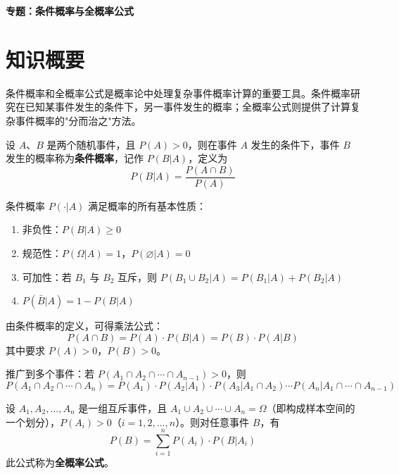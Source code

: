 \documentclass[11pt]{ctexrep}
\begin{document}
\begin{center}
    {\LARGE\bfseries 专题：条件概率与全概率公式}
\end{center}

\section*{知识概要}

条件概率和全概率公式是概率论中处理复杂事件概率计算的重要工具。条件概率研究在已知某事件发生的条件下，另一事件发生的概率；全概率公式则提供了计算复杂事件概率的"分而治之"方法。

\begin{definition}[条件概率]
    设 $A$、$B$ 是两个随机事件，且 $P(A) > 0$，则在事件 $A$ 发生的条件下，事件 $B$ 发生的概率称为\textbf{条件概率}，记作 $P(B|A)$，定义为
    \[
        P(B|A) = \frac{P(A \cap B)}{P(A)}
    \]
\end{definition}

\begin{property}[条件概率的性质]
    条件概率 $P(\cdot | A)$ 满足概率的所有基本性质：
    \begin{enumerate}
        \item 非负性：$P(B|A) \geq 0$
        \item 规范性：$P(\Omega | A) = 1$，$P(\varnothing | A) = 0$
        \item 可加性：若 $B_1$ 与 $B_2$ 互斥，则 $P(B_1 \cup B_2 | A) = P(B_1 | A) + P(B_2 | A)$
        \item $P(\bar{B} | A) = 1 - P(B | A)$
    \end{enumerate}
\end{property}

\begin{property}[乘法公式]
    由条件概率的定义，可得乘法公式：
    \[
        P(A \cap B) = P(A) \cdot P(B | A) = P(B) \cdot P(A | B)
    \]
    其中要求 $P(A) > 0$，$P(B) > 0$。
    
    推广到多个事件：若 $P(A_1 \cap A_2 \cap \cdots \cap A_{n-1}) > 0$，则
    \[
        P(A_1 \cap A_2 \cap \cdots \cap A_n) = P(A_1) \cdot P(A_2 | A_1) \cdot P(A_3 | A_1 \cap A_2) \cdots P(A_n | A_1 \cap \cdots \cap A_{n-1})
    \]
\end{property}

\begin{definition}[全概率公式]
    设 $A_1, A_2, \ldots, A_n$ 是一组互斥事件，且 $A_1 \cup A_2 \cup \cdots \cup A_n = \Omega$（即构成样本空间的一个划分），$P(A_i) > 0$（$i = 1, 2, \ldots, n$）。则对任意事件 $B$，有
    \[
        P(B) = \sum_{i=1}^{n} P(A_i) \cdot P(B | A_i)
    \]
    此公式称为\textbf{全概率公式}。
\end{definition}
\end{document}
